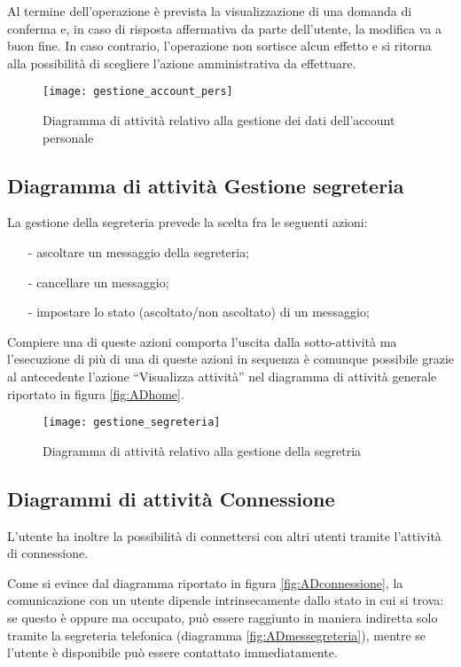 Al termine dell'operazione è prevista la visualizzazione di una domanda di conferma e, in caso di risposta affermativa da parte dell'utente, la modifica va a buon fine. In caso contrario, l'operazione non sortisce alcun effetto e si ritorna alla possibilità di scegliere l'azione amministrativa da effettuare.

\begin{figure}[H]
\centering
\texttt{[image: gestione\_account\_pers]}
\caption{Diagramma di attività relativo alla gestione dei dati dell'account personale}\label{fig:ADgestioneaccount}
\end{figure}

\subsection{Diagramma di attività Gestione segreteria}
La gestione della segreteria prevede la scelta fra le seguenti azioni:
\begin{itemize}[noitemsep,nolistsep]
 \item[-] ascoltare un messaggio della segreteria;
 \item[-] cancellare un messaggio;
 \item[-] impostare lo stato (ascoltato/non ascoltato) di un messaggio;
\end{itemize}

Compiere una di queste azioni comporta l'uscita dalla sotto-attività ma l'esecuzione di più di una di queste azioni in sequenza è comunque possibile grazie al  antecedente l'azione ``Visualizza attività'' nel diagramma di attività generale riportato in figura \vref{fig:ADhome}.

\begin{figure}[H]
\centering
\texttt{[image: gestione\_segreteria]}
\caption{Diagramma di attività relativo alla gestione della segretria}\label{fig:ADgestionesegreteria}
\end{figure}

\subsection{Diagrammi di attività Connessione}
L'utente ha inoltre la possibilità di connettersi con altri utenti tramite l'attività di connessione.

Come si evince dal diagramma riportato in figura \vref{fig:ADconnessione}, la comunicazione con un utente dipende intrinsecamente dallo stato in cui si trova: se questo è  oppure  ma occupato, può essere raggiunto in maniera indiretta solo tramite la segreteria telefonica (diagramma \ref{fig:ADmessegreteria}), mentre se l'utente è disponibile può essere contattato immediatamente.

